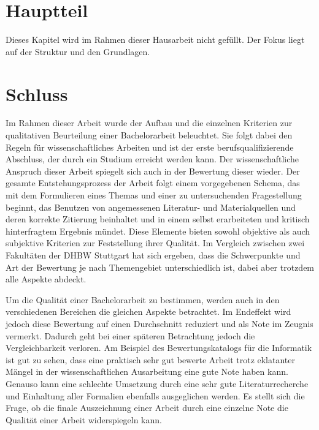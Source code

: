 
\chapter{Hauptteil}
Dieses Kapitel wird im Rahmen dieser Hausarbeit nicht gefüllt. Der Fokus liegt auf der Struktur und den Grundlagen.


\chapter{Schluss}
Im Rahmen dieser Arbeit wurde der Aufbau und die einzelnen Kriterien zur qualitativen Beurteilung einer Bachelorarbeit beleuchtet. Sie folgt dabei den Regeln für wissenschaftliches Arbeiten und ist der erste berufsqualifizierende Abschluss, der durch ein Studium erreicht werden kann.
Der wissenschaftliche Anspruch dieser Arbeit spiegelt sich auch in der Bewertung dieser wieder. Der gesamte Entstehungsprozess der Arbeit folgt einem vorgegebenen Schema, das mit dem Formulieren eines Themas und einer zu untersuchenden Fragestellung beginnt, das Benutzen von angemessenen Literatur- und Materialquellen und deren korrekte Zitierung beinhaltet und in einem selbst erarbeiteten und kritisch hinterfragtem Ergebnis mündet. Diese Elemente bieten sowohl objektive als auch subjektive Kriterien zur Feststellung ihrer Qualität. Im Vergleich zwischen zwei Fakultäten der \ac{DHBW} Stuttgart hat sich ergeben, dass die Schwerpunkte und Art der Bewertung je nach Themengebiet unterschiedlich ist, dabei aber trotzdem alle Aspekte abdeckt. 

Um die Qualität einer Bachelorarbeit zu bestimmen, werden auch in den verschiedenen Bereichen die gleichen Aspekte betrachtet. Im Endeffekt wird jedoch diese Bewertung auf einen Durchschnitt reduziert und als Note im Zeugnis vermerkt. Dadurch geht bei einer späteren Betrachtung jedoch die Vergleichbarkeit verloren. Am Beispiel des Bewertungskatalogs für die Informatik ist gut zu sehen, dass eine praktisch sehr gut bewerte Arbeit trotz eklatanter Mängel in der wissenschaftlichen Ausarbeitung eine gute Note haben kann. Genauso kann eine schlechte Umsetzung durch eine sehr gute Literaturrecherche und Einhaltung aller Formalien ebenfalls ausgeglichen werden. Es stellt sich die Frage, ob die finale Auszeichnung einer Arbeit durch eine einzelne Note die Qualität einer Arbeit widerspiegeln kann. 
 
